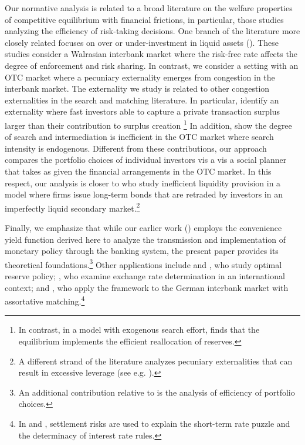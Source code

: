 Our normative analysis is related to a broad literature on the welfare
properties of competitive equilibrium with financial frictions, in
particular, those studies analyzing the efficiency of risk-taking
decisions. One branch of the literature more closely related focuses
on over or under-investment in liquid assets (\citealp{Jacklin1987,Bhattacharya1987,Farhi2009,Yared2013,Geanakoplos2017}).
These studies consider a Walrasian interbank market where the risk-free
rate affects the degree of enforcement and risk sharing. In contrast,
we consider a setting with an OTC market where a pecuniary externality
emerges from congestion in the interbank market. The externality we
study is related to other congestion externalities in the search and
matching literature. In particular, \cite{Uslu2019} identify an externality where
fast investors able to capture a private transaction surplus larger
than their contribution to surplus creation \footnote{In contrast, in a model with exogenous search effort, \cite{afonso2015over}
finds that the equilibrium implements the efficient reallocation of
reserves.} In addition, \cite{WongZhang2023} show the degree of search and intermediation
is inefficient in the OTC market where search intensity is endogenous.
Different from these contributions, our approach compares the portfolio
choices of individual investors vis a vis a social planner that takes
as given the financial arrangements in the OTC market. In this respect,
our analysis is closer to \cite{Arseneau2017} who study inefficient liquidity
provision in a model where firms issue long-term bonds that are retraded
by investors in an imperfectly liquid secondary market.\footnote{A different strand of the literature analyzes pecuniary externalities
that can result in excessive leverage (see e.g. \citealp{caballero2001international,Lorenzoni2008,bianchi2011overborrowing,davila2018pecuniary,amador2024bank}). }


Finally, we emphasize that while our earlier work (\citealp{BB17}) employs the convenience yield function derived here to analyze the transmission and implementation of monetary policy through the banking system, the present paper provides its theoretical foundations.\footnote{An additional contribution relative to \citet{BB17} is the analysis of efficiency of portfolio choices.} Other applications include \citet{Arce2019} and \citet{Bigio2019}, who study optimal reserve policy; \citet{Bianchi2020}, who examine exchange rate determination in an international context; and \citet{bittner2025assortative}, who apply the framework to the German interbank market with assortative matching.\footnote{In \citet{Piazzesi2019} and \citet{Lenel2019}, settlement risks are used to explain the short-term rate puzzle and the determinacy of interest rate rules.}

